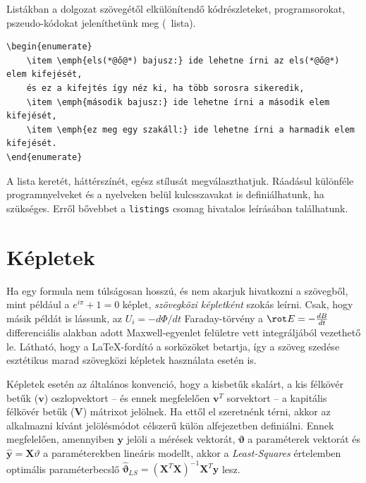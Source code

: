Listákban a dolgozat szövegétől elkülönítendő kódrészleteket, programsorokat, pszeudo-kódokat jeleníthetünk meg (~lista). 
\begin{lstlisting}[caption=A fenti számozott felsorolás \LaTeX-forráskódja,label=listing:Example]
\begin{enumerate}
	\item \emph{els(*@ő@*) bajusz:} ide lehetne írni az els(*@ő@*) elem kifejését, 
	és ez a kifejtés így néz ki, ha több sorosra sikeredik,
	\item \emph{második bajusz:} ide lehetne írni a második elem kifejését,
	\item \emph{ez meg egy szakáll:} ide lehetne írni a harmadik elem kifejését.
\end{enumerate}
\end{lstlisting}
A lista keretét, háttérszínét, egész stílusát megválaszthatjuk. Ráadásul különféle programnyelveket és a nyelveken belül kulcsszavakat is definiálhatunk, ha szükséges. Erről bővebbet a \verb+listings+ csomag hivatalos leírásában találhatunk.

\section{Képletek}
Ha egy formula nem túlságosan hosszú, és nem akarjuk hivatkozni a szövegből, mint például a $e^{i\pi}+1=0$ képlet, \emph{szövegközi képletként} szokás leírni. Csak, hogy másik példát is lássunk, az $U_i=-d\Phi/dt$ Faraday-törvény a $\rot E=-\frac{dB}{dt}$ differenciális alakban adott Maxwell-egyenlet felületre vett integráljából vezethető le. Látható, hogy a \LaTeX-fordító a sorközöket betartja, így a szöveg szedése esztétikus marad szövegközi képletek használata esetén is.

Képletek esetén az általános konvenció, hogy a kisbetűk skalárt, a kis félkövér betűk ($\mathbf{v}$) oszlopvektort -- és ennek megfelelően $\mathbf{v}^T$ sorvektort -- a kapitális félkövér betűk ($\mathbf{V}$) mátrixot jelölnek. Ha ettől el szeretnénk térni, akkor az alkalmazni kívánt jelölésmódot célszerű külön alfejezetben definiálni. Ennek megfelelően, amennyiben $\mathbf{y}$ jelöli a mérések vektorát, $\mathbf{\vartheta}$ a paraméterek vektorát és $\hat{\mathbf{y}}=\mathbf{X}\vartheta$ a paraméterekben lineáris modellt, akkor a \emph{Least-Squares} értelemben optimális paraméterbecslő $\hat{\mathbf{\vartheta}}_{LS}=(\mathbf{X}^T\mathbf{X})^{-1}\mathbf{X}^T\mathbf{y}$ lesz.

